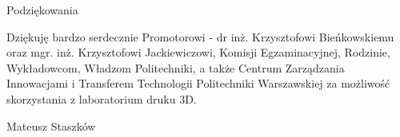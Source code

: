 \noindent
{\Large Podziękowania}
\bigskip

Dziękuję bardzo serdecznie Promotorowi - dr inż. Krzysztofowi Bieńkowskiemu oraz mgr. inż. Krzysztofowi Jackiewiczowi, Komisji Egzaminacyjnej, Rodzinie, Wykładowcom, Władzom Politechniki, a także Centrum Zarządzania Innowacjami i Transferem Technologii Politechniki Warszawskiej za możliwość skorzystania z laboratorium druku 3D.

\bigskip

{\raggedleft
Mateusz Staszków

}

